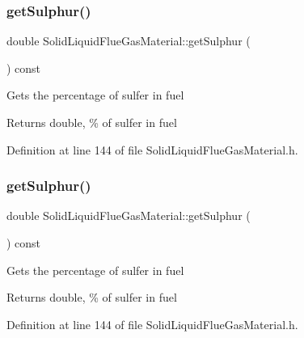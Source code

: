 \subsubsection{\texorpdfstring{get\+Sulphur()}{getSulphur()}\hspace{0.1cm}{\footnotesize\ttfamily [1/3]}}
{\footnotesize\ttfamily double Solid\+Liquid\+Flue\+Gas\+Material\+::get\+Sulphur (\begin{DoxyParamCaption}{ }\end{DoxyParamCaption}) const\hspace{0.3cm}{\ttfamily [inline]}}

Gets the percentage of sulfer in fuel \begin{DoxyReturn}{Returns}
double, \% of sulfer in fuel 
\end{DoxyReturn}


Definition at line 144 of file Solid\+Liquid\+Flue\+Gas\+Material.\+h.

\mbox{\label{class_solid_liquid_flue_gas_material_abe35d8ff283bfa5aadcf00f9906025ae}} 
\subsubsection{\texorpdfstring{get\+Sulphur()}{getSulphur()}\hspace{0.1cm}{\footnotesize\ttfamily [2/3]}}
{\footnotesize\ttfamily double Solid\+Liquid\+Flue\+Gas\+Material\+::get\+Sulphur (\begin{DoxyParamCaption}{ }\end{DoxyParamCaption}) const\hspace{0.3cm}{\ttfamily [inline]}}

Gets the percentage of sulfer in fuel \begin{DoxyReturn}{Returns}
double, \% of sulfer in fuel 
\end{DoxyReturn}


Definition at line 144 of file Solid\+Liquid\+Flue\+Gas\+Material.\+h.

\mbox{\label{class_solid_liquid_flue_gas_material_abe35d8ff283bfa5aadcf00f9906025ae}} 
